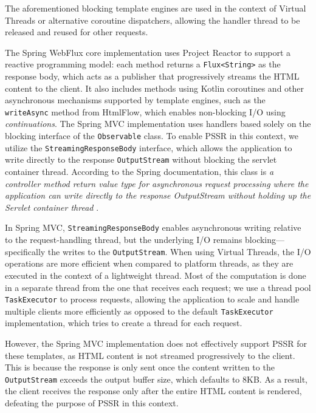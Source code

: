 The aforementioned blocking template engines are used in
the context of Virtual Threads or alternative coroutine dispatchers, allowing
the handler thread to be released and reused for other requests.

The Spring WebFlux core implementation uses Project Reactor to support a reactive
programming model: each method returns a \texttt{Flux<String>} as the response
body, which acts as a publisher that progressively streams the HTML content to
the client. It also includes methods using Kotlin coroutines and other
asynchronous mechanisms supported by template engines, such as the
\texttt{writeAsync} method from HtmlFlow, which enables non-blocking I/O
using \textit{continuations}. 
The Spring MVC implementation uses handlers based solely on the blocking
interface of the \texttt{Observable} class. To enable PSSR in this context, we utilize
the \texttt{StreamingResponseBody} interface, which allows the application to
write directly to the response \texttt{OutputStream} without blocking the servlet
container thread. According to the Spring documentation, this class is \textit{a
controller method return value type for asynchronous request processing where
the application can write directly to the response OutputStream without holding
up the Servlet container thread} \cite{Spring-StreamingResponseBody}.

In Spring MVC, \texttt{StreamingResponseBody} enables asynchronous writing relative to
the request-handling thread, but the underlying I/O remains
blocking—specifically the writes to the \texttt{OutputStream}. When using Virtual
Threads, the I/O operations are more efficient when compared to platform threads,
as they are executed in the context of a lightweight thread. Most of the computation is done in a separate
thread from the one that receives each request; we use a thread pool
\texttt{TaskExecutor} to process requests, allowing the application to scale and
handle multiple clients more efficiently as opposed to the default
\texttt{TaskExecutor} implementation, which tries to create a thread for each request.

However, the Spring MVC implementation does not effectively support PSSR for
these templates, as HTML content is not streamed progressively to the client.
This is because the response is only sent once the content written to the
\texttt{OutputStream} exceeds the output buffer size, which defaults to 8KB\@. As a
result, the client receives the response only after the entire HTML content is
rendered, defeating the purpose of PSSR in this context.

